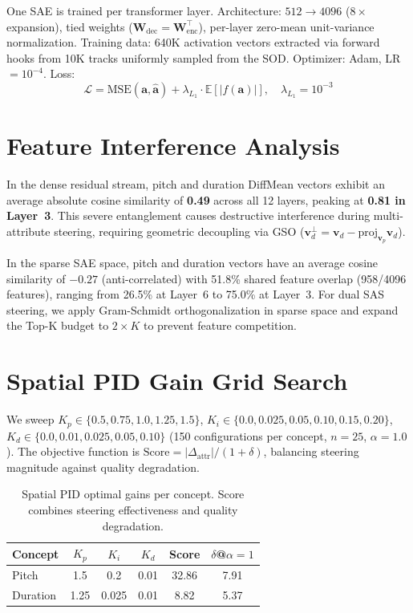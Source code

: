 \documentclass{article}
\theoremstyle{plain}
\begin{document}
One SAE is trained per transformer layer. Architecture: $512 \to 4096$ ($8{\times}$ expansion), tied weights ($\mathbf{W}_\text{dec} = \mathbf{W}_\text{enc}^\top$), per-layer zero-mean unit-variance normalization. Training data: 640K activation vectors extracted via forward hooks from 10K tracks uniformly sampled from the SOD. Optimizer: Adam, LR $= 10^{-4}$. Loss:
\begin{equation}
    \mathcal{L} = \text{MSE}(\mathbf{a}, \hat{\mathbf{a}}) + \lambda_{L_1} \cdot \mathbb{E}[|f(\mathbf{a})|], \quad \lambda_{L_1} = 10^{-3}
\end{equation}

\section{Feature Interference Analysis}
\label{app:interference}

In the dense residual stream, pitch and duration DiffMean vectors exhibit an average absolute cosine similarity of \textbf{0.49} across all 12 layers, peaking at \textbf{0.81 in Layer~3}. This severe entanglement causes destructive interference during multi-attribute steering, requiring geometric decoupling via GSO ($\mathbf{v}^{\perp}_d = \mathbf{v}_d - \text{proj}_{\mathbf{v}_p}\mathbf{v}_d$).

In the sparse SAE space, pitch and duration vectors have an average cosine similarity of $-0.27$ (anti-correlated) with 51.8\% shared feature overlap (958/4096 features), ranging from 26.5\% at Layer~6 to 75.0\% at Layer~3. For dual SAS steering, we apply Gram-Schmidt orthogonalization in sparse space and expand the Top-K budget to $2{\times}K$ to prevent feature competition.

\section{Spatial PID Gain Grid Search}
\label{app:grid_search}

We sweep $K_p \in \{0.5, 0.75, 1.0, 1.25, 1.5\}$, $K_i \in \{0.0, 0.025, 0.05, 0.10, 0.15, 0.20\}$, $K_d \in \{0.0, 0.01, 0.025, 0.05, 0.10\}$ (150 configurations per concept, $n{=}25$, $\alpha{=}1.0$). The objective function is $\text{Score} = |\Delta_\text{attr}| / (1 + \delta)$, balancing steering magnitude against quality degradation.

\begin{table}[h]
  \caption{Spatial PID optimal gains per concept. Score combines steering effectiveness and quality degradation.}
  \label{tab:grid_search}
  \begin{center}
  \begin{small}
  \begin{tabular}{lccccc}
    \toprule
    Concept & $K_p$ & $K_i$ & $K_d$ & Score & $\delta$@$\alpha{=}1$ \\
    \midrule
    Pitch & 1.5 & 0.2 & 0.01 & 32.86 & 7.91 \\
    Duration & 1.25 & 0.025 & 0.01 & 8.82 & 5.37 \\
    \bottomrule
  \end{tabular}
  \end{small}
  \end{center}
\end{table}
\end{document}
